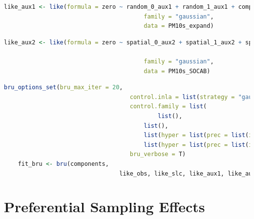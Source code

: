 \begin{lstlisting}[language = R]
	like_aux1 <- like(formula = zero ~ random_0_aux1 + random_1_aux1 + comp_aux1,  
										family = "gaussian",  
										data = PM10s_expand)
\end{lstlisting} \label{code:inlabru_lik_aux1}

\begin{lstlisting}[language = R]
	like_aux2 <- like(formula = zero ~ spatial_0_aux2 + spatial_1_aux2 + spatial_2_aux2 + 
																		 comp_aux2,  
										family = "gaussian",  
										data = PM10s_SOCAB)
\end{lstlisting} \label{code:inlabru_lik_aux2}

\begin{lstlisting}[language = R]
	bru_options_set(bru_max_iter = 20,                
									control.inla = list(strategy = "gaussian", int.strategy = 'eb'),                
									control.family = list(
											list(), 
								    	list(), 
								     	list(hyper = list(prec = list(initial = 20, fixed=TRUE))),                  
								     	list(hyper = list(prec = list(initial = 20, fixed=TRUE)))),                
									bru_verbose = T)
	fit_bru <- bru(components, 
								 like_obs, like_slc, like_aux1, like_aux2)
\end{lstlisting} \label{code:inlabru_fit}

\section{Preferential Sampling Effects}